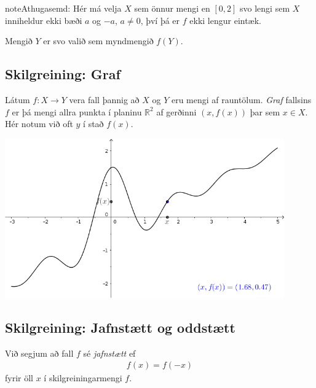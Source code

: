 \documentclass[b5paper,10pt,icelandic]{sphinxmanual}
\begin{document}
\begin{sphinxadmonition}{note}{Athugasemd:}
Hér má velja \(X\) sem önnur mengi en \([0,2]\) svo lengi sem
\(X\) inniheldur ekki bæði \(a\) og \(-a\), \(a\neq 0\),
því þá er \(f\) ekki lengur eintæk.

Mengið \(Y\) er svo valið sem myndmengið \(f(Y)\).
\end{sphinxadmonition}


\subsection{Skilgreining: Graf}
\label{\detokenize{kafli01:skilgreining-graf}}
Látum \(f:X \to Y\) vera fall þannig að \(X\)
og \(Y\) eru mengi af rauntölum. \textit{Graf} fallsins \(f\) er þá
mengi allra punkta í planinu \(\mathbb{R}^2\) af gerðinni
\((x,f(x))\) þar sem \(x\in X\). Hér notum við oft \(y\) í stað
\(f(x)\).


\begin{center}
\includegraphics[width=12cm,keepaspectratio=true]{04_Graf_falls.png}
\end{center}



\subsection{Skilgreining: Jafnstætt og oddstætt}
\label{\detokenize{kafli01:skilgreining-jafnstaett-og-oddstaett}}\label{\detokenize{kafli01:index-10}}
Við segjum að fall \(f\) sé \textit{jafnstætt} ef
\begin{equation*}
\begin{split}f(x) = f(-x)\end{split}
\end{equation*}
fyrir öll \(x\) í skilgreiningarmengi \(f\).
\end{document}
